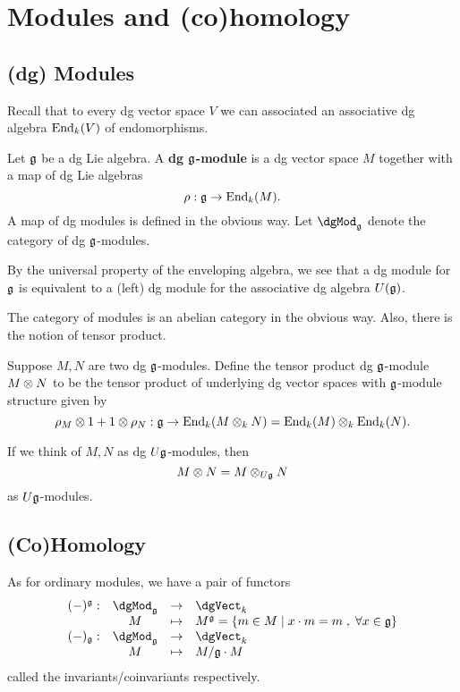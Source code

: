 \documentclass[11pt]{amsart}
\begin{document}
\section{Modules and (co)homology}

\subsection{(dg) Modules}

Recall that to every dg vector space $V$ we can associated an associative dg algebra ${\rm End}_k(V)$ of endomorphisms. 

\begin{dfn}
Let $\mathfrak g$ be a dg Lie algebra.
A {\bf dg $\mathfrak g$-module} is a dg vector space $M$ together with a map of dg Lie algebras
\[
\rho : \mathfrak g \to {\rm End}_k(M) .
\]
A map of dg modules is defined in the obvious way. 
Let $\dgMod_{\fg}$ denote the category of dg $\mathfrak g$-modules. 
\end{dfn}

\begin{rmk}
By the universal property of the enveloping algebra, we see that a dg module for $\mathfrak g$ is equivalent to a (left) dg module for the associative dg algebra $U(\mathfrak g)$. 
\end{rmk}

The category of modules is an abelian category in the obvious way. 
Also, there is the notion of tensor product. 

\begin{dfn}
Suppose $M,N$ are two dg $\mathfrak g$-modules.
Define the tensor product dg $\mathfrak g$-module $M \otimes N$ to be the tensor product of underlying dg vector spaces with $\mathfrak g$-module structure given by
\[
\rho_{M} \otimes 1 + 1 \otimes \rho_N : \mathfrak g \to {\rm End}_k(M \otimes_k N) = {\rm End}_k(M) \otimes_k {\rm End}_k(N) .
\]
\end{dfn}

\begin{rmk}
If we think of $M,N$ as dg $U\mathfrak g$-modules, then 
\[
M \otimes N = M \otimes_{U\mathfrak g} N
\]
as $U \mathfrak g$-modules. 
\end{rmk}

\subsection{(Co)Homology}

As for ordinary modules, we have a pair of functors
\[
\begin{array}{cccl}
(-)^\fg : & \dgMod_\fg & \to & \dgVect_k  \\
& M & \mapsto & M^\fg = \{m \in M \; | \; x \cdot m = m \; , \; \forall x \in \fg\} \\
(-)_{\fg} : & \dgMod_{\fg} & \to & \dgVect_k \\
& M & \mapsto & M / \fg \cdot M 
\end{array}
\]
called the invariants/coinvariants respectively. 
\end{document}

